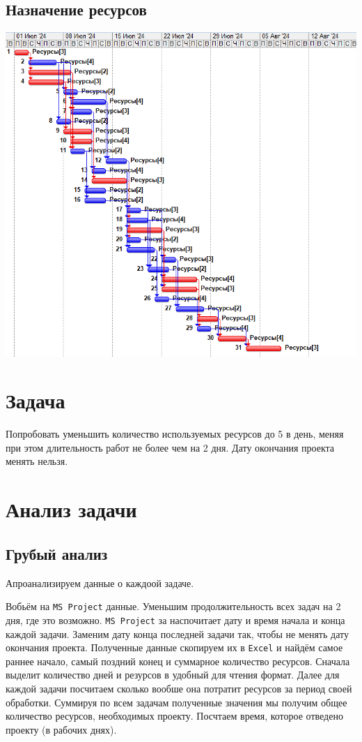 \documentclass[14pt]{article}
\begin{document}
	\subsection{Назначение ресурсов}
	\includegraphics[width=\textwidth]{../img/init_resource_manage.png}
\section{Задача}
	Попробовать уменьшить количество используемых ресурсов до 5 в день, меняя при этом длительность работ не более чем на 2 дня.
	Дату окончания проекта менять нельзя.
\section{Анализ задачи}
	\subsection{Грубый анализ}
		Апроанализируем данные о каждоой задаче.
		
		Вобьём на \texttt{MS Project} данные.
		Уменьшим продолжительность всех задач на 2 дня, где это возможно.
		\texttt{MS Project} за наспочитает дату и время начала и конца каждой задачи.
		Заменим дату конца последней задачи так, чтобы не менять дату окончания проекта.
		Полученные данные скопируем их в \texttt{Excel} и найдём самое раннее начало,
			самый поздний конец и суммарное количество ресурсов.
		Сначала выделит количество дней и резурсов в удобный для чтения формат.
		Далее для каждой задачи посчитаем сколько вообше она потратит ресурсов за период своей обработки.
		Суммируя по всем задачам полученные значения мы получим общее количество ресурсов, необходимых проекту.
		Посчтаем время, которое отведено проекту (в рабочих днях).
		
\end{document}
